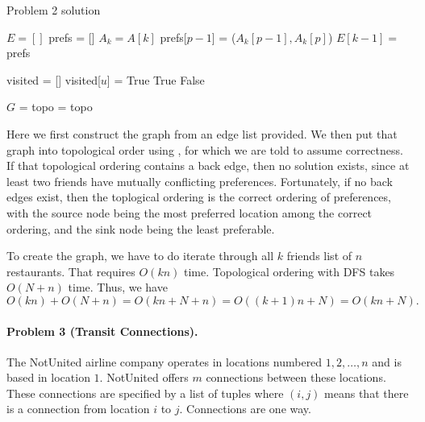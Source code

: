\documentclass[11pt]{article}
\begin{document}
\begin{algorithm}
\caption{Problem 2 solution}
\begin{algorithmic}[1]
    \State $E = []$
        \State prefs = []
        \State $A_{k} = A[k]$
            \State prefs[$p-1$] = ($A_{k}[p-1], A_{k}[p]$)
        \EndFor
        \State $E[k-1] =$ prefs
    \EndFor
\EndProcedure

    \State visited = []
        \State visited[$u$] = True
                \State \Return True
            \EndIf
        \EndFor
    \EndFor
    \State \Return False
\EndProcedure 

    \State $G$ = 
    \State topo = 
        \State {}
    \Else
        \State \Return topo
    \EndIf
\EndProcedure 
\end{algorithmic}
\end{algorithm}

Here we first construct the graph from an edge list provided. We then put that
graph into topological order using , for which we are told to assume
correctness. If that topological ordering contains a back edge, then no
solution exists, since at least two friends have mutually conflicting 
preferences. Fortunately, if no back edges exist, then the toplogical ordering
is the correct ordering of preferences, with the source node being the most
preferred location among the correct ordering, and the sink node being the
least preferable.

To create the graph, we have to do iterate through all $k$ friends list of
$n$ restaurants. That requires $O(kn)$ time. Topological ordering with DFS 
takes $O(N+n)$ time. Thus, we have
\[
    O(kn) + O(N+n) = O(kn + N + n) = O((k+1)n + N) = \boxed{O(kn + N)}.
\]



\newpage
\paragraph{Problem 3 (Transit Connections).} The NotUnited airline company operates in locations numbered $1, 2, \dots, n$ and is based in location $1$. NotUnited offers $m$ connections between these locations. These connections are specified by a list of tuples where $(i, j)$ means that there is a connection from location $i$ to $j$. Connections are one way.
\end{document}
